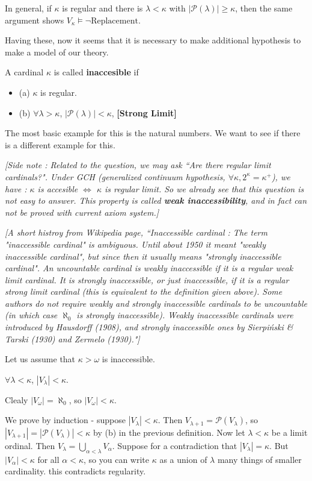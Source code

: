 \documentclass[12pt,a4paper]{article}
\newenvironment{proof}
{\begin{changemargin}{0.5cm}{0.5cm} 
	}%
	{\end{changemargin}
}
\renewenvironment{i}
{\begin{itemize} 
	}%
	{\end{itemize}
}
\newenvironment{p}
{\begin{proof} 
	}%
	{\end{proof}
}
\begin{document}
\quad In general, if $\kappa$ is regular and there is $\lambda < \kappa$ with $|\mathscr{P}(\lambda)|\geq \kappa$, then the same argument shows $V_{\kappa} \models \neg \text{Replacement}$.
\s

Having these, now it seems that it is necessary to make additional hypothesis to make a model of our theory.
\s

 A cardinal $\kappa$ is called \textbf{inaccesible} if
\begin{i}
\item[(a)] $\kappa$ is regular.
\item[(b)] $\forall \lambda > \kappa$, $|\mathscr{P}(\lambda)| < \kappa$, \quad \textbf{[Strong Limit]}
\end{i}
The most basic example for this is the natural numbers. We want to see if there is a different example for this.
\s

\emph{[Side note : Related to the question, we may ask ``Are there regular limit cardinals?". Under GCH (generalized continuum hypothesis, $\forall \kappa,2^{\kappa} = \kappa^+$), we have : $\kappa$ is accesible $\Leftrightarrow$ $\kappa$ is regular limit. So we already see that this question is not easy to answer. This property is called \textbf{weak inaccessibility}, and in fact can not be proved with current axiom system.]}
\s

\emph{[A short histroy from Wikipedia page, ``Inaccessible cardinal : The term "inaccessible cardinal" is ambiguous. Until about 1950 it meant "weakly inaccessible cardinal", but since then it usually means "strongly inaccessible cardinal". An uncountable cardinal is weakly inaccessible if it is a regular weak limit cardinal. It is strongly inaccessible, or just inaccessible, if it is a regular strong limit cardinal (this is equivalent to the definition given above). Some authors do not require weakly and strongly inaccessible cardinals to be uncountable (in which case $\aleph_{0}$ is strongly inaccessible). Weakly inaccessible cardinals were introduced by Hausdorff (1908), and strongly inaccessible ones by Sierpi\'nski \& Tarski (1930) and Zermelo (1930)."]}
\s

Let us assume that $\kappa> \omega$ is inaccessible. 
\s

\lem $\forall \lambda < \kappa$, $|V_{\lambda}|< \kappa$.
\begin{p}
\pf Clealy $|V_{\omega}| = \aleph_{0}$, so $|V_{\omega}| < \kappa$.

\quad We prove by induction - suppose $|V_{\lambda}| < \kappa$. Then $V_{\lambda +1}= \mathscr{P}(V_{\lambda})$, so $|V_{\lambda +1}| = |\mathscr{P}(V_{\lambda})|< \kappa$ by (b) in the previous definition. Now let $\lambda < \kappa$ be a limit ordinal. Then $V_{\lambda} = \bigcup_{\alpha < \lambda} V_{\alpha}$. Suppose for a contradiction that $|V_{\lambda}| = \kappa$. But $|V_{\alpha}| < \kappa$ for all $\alpha < \kappa$, so you can write $\kappa$ as a union of $\lambda$ many things of smaller cardinality. this contradicts regularity.

\eop
\end{p}
\s
\end{document}
